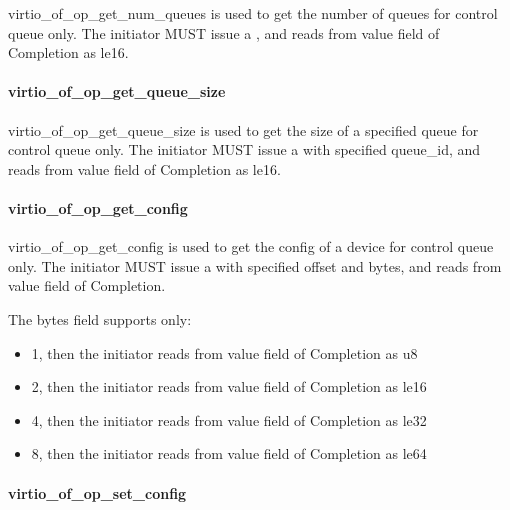virtio_of_op_get_num_queues is used to get the number of queues for control queue only. The initiator MUST issue a , and reads from value field of Completion as le16.

\paragraph{virtio_of_op_get_queue_size}\label{sec:Virtio Transport Options / Virtio Over Fabrics / Transmission Protocol / Opcodes Definition / virtio_of_op_get_queue_size}

virtio_of_op_get_queue_size is used to get the size of a specified queue for control queue only. The initiator MUST issue a  with specified queue_id, and reads from value field of Completion as le16.

\paragraph{virtio_of_op_get_config}\label{sec:Virtio Transport Options / Virtio Over Fabrics / Transmission Protocol / Opcodes Definition / virtio_of_op_get_config}

virtio_of_op_get_config is used to get the config of a device for control queue only. The initiator MUST issue a  with specified offset and bytes, and reads from value field of Completion.

The bytes field supports only:

\begin{itemize}
\item 1, then the initiator reads from value field of Completion as u8
\item 2, then the initiator reads from value field of Completion as le16
\item 4, then the initiator reads from value field of Completion as le32
\item 8, then the initiator reads from value field of Completion as le64
\end{itemize}

\paragraph{virtio_of_op_set_config}\label{sec:Virtio Transport Options / Virtio Over Fabrics / Transmission Protocol / Opcodes Definition / virtio_of_op_set_config}

